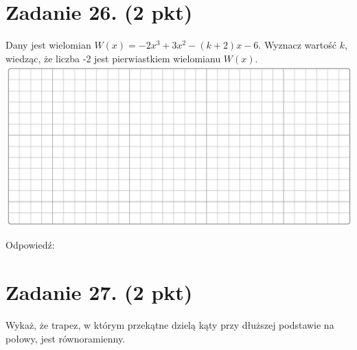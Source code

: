 \documentclass[10pt]{article}
\begin{document}
\section*{Zadanie 26. (2 pkt)}
Dany jest wielomian \(W(x)=-2 x^{3}+3 x^{2}-(k+2) x-6\). Wyznacz wartość \(k\), wiedząc, że liczba -2 jest pierwiastkiem wielomianu \(W(x)\).\\
\includegraphics[max width=\textwidth, center]{2024_11_21_769d5953f978b92e06f5g-10}

Odpowiedź:

\section*{Zadanie 27. (2 pkt)}
Wykaż, że trapez, w którym przekątne dzielą kąty przy dłuższej podstawie na połowy, jest równoramienny.
\end{document}
